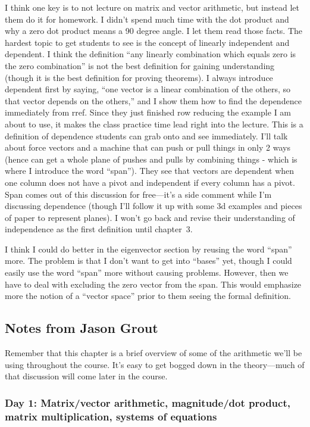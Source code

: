 I think one key is to not lecture on matrix and vector arithmetic, but instead let them do it for homework.  I didn't spend much time with the dot product and why a zero dot product means a 90 degree angle.  I let them read those facts.  The hardest topic to get students to see is the concept of linearly independent and dependent.  I think the definition ``any linearly combination which equals zero is the zero combination'' is not the best definition for gaining understanding (though it is the best definition for proving theorems).  I always introduce dependent first by saying, ``one vector is a linear combination of the others, so that vector depends on the others,'' and I show them how to find the dependence immediately from rref. Since they just finished row reducing the example I am about to use, it makes the class practice time lead right into the lecture.  This is a definition of dependence students can grab onto and see immediately. I'll talk about force vectors and a machine that can push or pull things in only 2 ways (hence can get a whole plane of pushes and pulls by combining things - which is where I introduce the word ``span'').  They see that vectors are dependent when one column does not have a pivot and independent if every column has a pivot. Span comes out of this discussion for free---it's a side comment while I'm discussing dependence (though I'll follow it up with some 3d examples and pieces of paper to represent planes). I won't go back and revise their understanding of independence as the first definition until chapter~3.

I think I could do better in the eigenvector section by reusing the word ``span'' more.  The problem is that I don't want to get into ``bases'' yet, though I could easily use the word ``span'' more without causing problems. However, then we have to deal with excluding the zero vector from the span. This would emphasize more the notion of a ``vector space'' prior to them seeing the formal definition.

\subsection*{Notes from Jason Grout}

Remember that this chapter is a brief overview of some of the arithmetic we'll be using throughout the course.  It's easy to get bogged down in the theory---much of that discussion will come later in the course.

\subsubsection*{Day 1: Matrix/vector arithmetic, magnitude/dot product, matrix multiplication, systems of equations}
\label{sec:day1}

